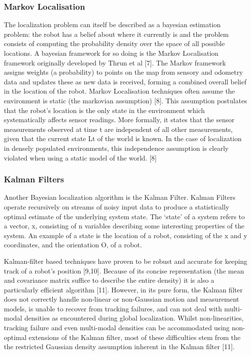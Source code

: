 \documentclass{article}
\begin{document}
	\subsubsection{Markov Localisation}
	The localization problem can itself be described as a bayesian estimation problem: the robot has a belief about where it currently is and the problem consists of computing the probability density over the space of all possible locations. A bayesian framework for so doing is the Markov Localisation framework originally developed by Thrun et al [7]. The Markov framework assigns weights (a probability) to points on the map from sensory and odometry data and updates these as new data is received, forming a combined overall belief in the location of the robot. Markov Localisation techniques often assume the environment is static (the markovian assumption) [8]. This assumption postulates that the robot's location is the only state in the environment which systematically affects sensor readings. More formally, it states that the sensor measurements observed at time t are independent of all other measurements, given that the current state Lt of the world is known. In the case of localization in densely populated environments, this independence assumption is clearly violated when using a static model of the world. [8]

	\subsubsection{Kalman Filters}
	Another Bayesian localization algorithm is the Kalman Filter. Kalman Filters operate recursively on streams of noisy input data to produce a statistically optimal estimate of the underlying system state. The ‘state’ of a system refers to a vector, x, consisting of n variables describing some interesting properties of the system. An example of a state is the location of a robot, consisting of the x and y coordinates, and the orientation O, of a robot.

	Kalman-filter based techniques have proven to be robust and accurate for keeping track of a robot’s position [9,10]. Because of its concise representation (the mean and covariance matrix suffice to describe the entire density) it is also a particularly efficient algorithm [11]. However, in its pure form, the Kalman filter does not correctly handle non-linear or non-Gaussian motion and measurement models, is unable to recover from tracking failures, and can not deal with multi-modal densities as encountered during global localization. Whilst non-linearities, tracking failure and even multi-modal densities can be accommodated using non-optimal extensions of the Kalman filter, most of these difficulties stem from the the restricted Gaussian density assumption inherent in the Kalman filter [11].
\end{document}
